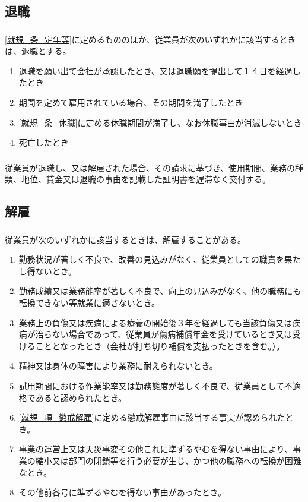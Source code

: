 \documentclass{jsarticle}
\begin{document}
\subsection{退職}
\label{就規_条_退職}
\subsubsection{}
\label{就規_項_退職}
\ref{就規_条_定年等}に定めるもののほか、従業員が次のいずれかに該当するときは、退職とする。
  \begin{enumerate}
    \item 退職を願い出て会社が承認したとき、又は退職願を提出して１４日を経過したとき
    \item 期間を定めて雇用されている場合、その期間を満了したとき
    \item \ref{就規_条_休職}に定める休職期間が満了し、なお休職事由が消滅しないとき
    \item 死亡したとき
  \end{enumerate}
\subsubsection{}
\label{就規_項_退職事由の証明}
従業員が退職し、又は解雇された場合、その請求に基づき、使用期間、業務の種類、地位、賃金又は退職の事由を記載した証明書を遅滞なく交付する。

\subsection{解雇}
\label{就規_条_解雇}
\subsubsection{}
\label{就規_項_解雇}
従業員が次のいずれかに該当するときは、解雇することがある。
  \begin{enumerate}
    \item 勤務状況が著しく不良で、改善の見込みがなく、従業員としての職責を果たし得ないとき。
    \item 勤務成績又は業務能率が著しく不良で、向上の見込みがなく、他の職務にも転換できない等就業に適さないとき。
    \item 業務上の負傷又は疾病による療養の開始後３年を経過しても当該負傷又は疾病が治らない場合であって、従業員が傷病補償年金を受けているとき又は受けることとなったとき（会社が打ち切り補償を支払ったときを含む。）。
    \item 精神又は身体の障害により業務に耐えられないとき。
    \item 試用期間における作業能率又は勤務態度が著しく不良で、従業員として不適格であると認められたとき。
    \item \ref{就規_項_懲戒解雇}に定める懲戒解雇事由に該当する事実が認められたとき。
    \item 事業の運営上又は天災事変その他これに準ずるやむを得ない事由により、事業の縮小又は部門の閉鎖等を行う必要が生じ、かつ他の職務への転換が困難なとき。
    \item その他前各号に準ずるやむを得ない事由があったとき。
  \end{enumerate}
\end{document}
